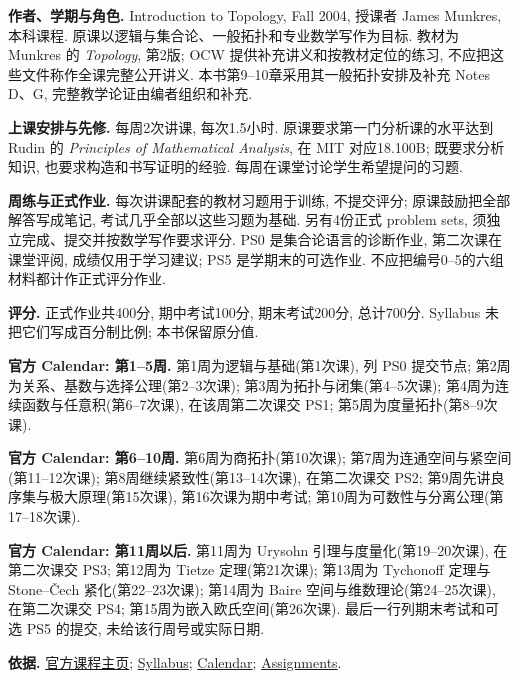 \par\addvspace{9pt}
\par\nobreak\vspace{4pt}

\textbf{作者、学期与角色.} Introduction to Topology, Fall 2004, 授课者 James Munkres, 本科课程. 原课以逻辑与集合论、一般拓扑和专业数学写作为目标. 教材为 Munkres 的 \emph{Topology}, 第2版; OCW 提供补充讲义和按教材定位的练习, 不应把这些文件称作全课完整公开讲义. 本书第9--10章采用其一般拓扑安排及补充 Notes D、G, 完整教学论证由编者组织和补充.

\textbf{上课安排与先修.} 每周2次讲课, 每次1.5小时. 原课要求第一门分析课的水平达到 Rudin 的 \emph{Principles of Mathematical Analysis}, 在 MIT 对应18.100B; 既要求分析知识, 也要求构造和书写证明的经验. 每周在课堂讨论学生希望提问的习题.

\textbf{周练与正式作业.} 每次讲课配套的教材习题用于训练, 不提交评分; 原课鼓励把全部解答写成笔记, 考试几乎全部以这些习题为基础. 另有4份正式 problem sets, 须独立完成、提交并按数学写作要求评分. PS0 是集合论语言的诊断作业, 第二次课在课堂评阅, 成绩仅用于学习建议; PS5 是学期末的可选作业. 不应把编号0--5的六组材料都计作正式评分作业.

\textbf{评分.} 正式作业共400分, 期中考试100分, 期末考试200分, 总计700分. Syllabus 未把它们写成百分制比例; 本书保留原分值.

\textbf{官方 Calendar: 第1--5周.} 第1周为逻辑与基础(第1次课), 列 PS0 提交节点; 第2周为关系、基数与选择公理(第2--3次课); 第3周为拓扑与闭集(第4--5次课); 第4周为连续函数与任意积(第6--7次课), 在该周第二次课交 PS1; 第5周为度量拓扑(第8--9次课).

\textbf{官方 Calendar: 第6--10周.} 第6周为商拓扑(第10次课); 第7周为连通空间与紧空间(第11--12次课); 第8周继续紧致性(第13--14次课), 在第二次课交 PS2; 第9周先讲良序集与极大原理(第15次课), 第16次课为期中考试; 第10周为可数性与分离公理(第17--18次课).

\textbf{官方 Calendar: 第11周以后.} 第11周为 Urysohn 引理与度量化(第19--20次课), 在第二次课交 PS3; 第12周为 Tietze 定理(第21次课); 第13周为 Tychonoff 定理与 Stone--\v{C}ech 紧化(第22--23次课); 第14周为 Baire 空间与维数理论(第24--25次课), 在第二次课交 PS4; 第15周为嵌入欧氏空间(第26次课). 最后一行列期末考试和可选 PS5 的提交, 未给该行周号或实际日期.

\textbf{依据.} \href{https://ocw.mit.edu/courses/18-901-introduction-to-topology-fall-2004/}{官方课程主页}; \href{https://ocw.mit.edu/courses/18-901-introduction-to-topology-fall-2004/pages/syllabus/}{Syllabus}; \href{https://ocw.mit.edu/courses/18-901-introduction-to-topology-fall-2004/pages/calendar/}{Calendar}; \href{https://ocw.mit.edu/courses/18-901-introduction-to-topology-fall-2004/pages/assignments/}{Assignments}.

